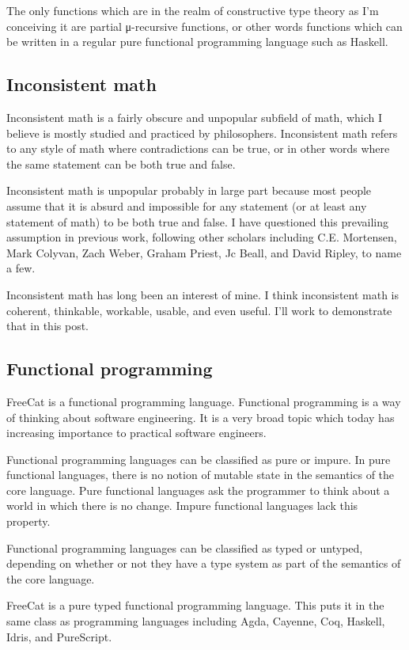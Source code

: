 \documentclass{article}
\begin{document}
The only functions which are in the realm of constructive type theory as I’m conceiving it are partial μ-recursive functions, or other words functions which can be written in a regular pure functional programming language such as Haskell.

\subsection{Inconsistent math}

Inconsistent math is a fairly obscure and unpopular subfield of math, which I believe is mostly studied and practiced by philosophers. Inconsistent math refers to any style of math where contradictions can be true, or in other words where the same statement can be both true and false.

Inconsistent math is unpopular probably in large part because most people assume that it is absurd and impossible for any statement (or at least any statement of math) to be both true and false. I have questioned this prevailing assumption in previous work, following other scholars including C.E. Mortensen, Mark Colyvan, Zach Weber, Graham Priest, Jc Beall, and David Ripley, to name a few.

Inconsistent math has long been an interest of mine. I think inconsistent math is coherent, thinkable, workable, usable, and even useful. I’ll work to demonstrate that in this post.

\subsection{Functional programming}

FreeCat is a functional programming language. Functional programming is a way of thinking about software engineering. It is a very broad topic which today has increasing importance to practical software engineers.

Functional programming languages can be classified as pure or impure. In pure functional languages, there is no notion of mutable state in the semantics of the core language. Pure functional languages ask the programmer to think about a world in which there is no change. Impure functional languages lack this property.

Functional programming languages can be classified as typed or untyped, depending on whether or not they have a type system as part of the semantics of the core language.

FreeCat is a pure typed functional programming language. This puts it in the same class as programming languages including Agda, Cayenne, Coq, Haskell, Idris, and PureScript.
\end{document}
